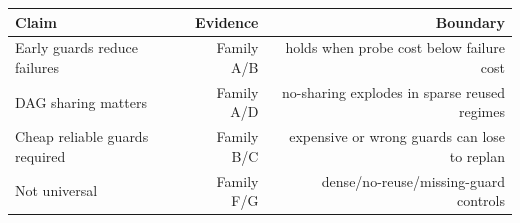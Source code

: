 \begin{tabular}{lrr}
\toprule
Claim & Evidence & Boundary \\
\midrule
Early guards reduce failures & Family A/B & holds when probe cost below failure cost \\
DAG sharing matters & Family A/D & no-sharing explodes in sparse reused regimes \\
Cheap reliable guards required & Family B/C & expensive or wrong guards can lose to replan \\
Not universal & Family F/G & dense/no-reuse/missing-guard controls \\
\bottomrule
\end{tabular}
